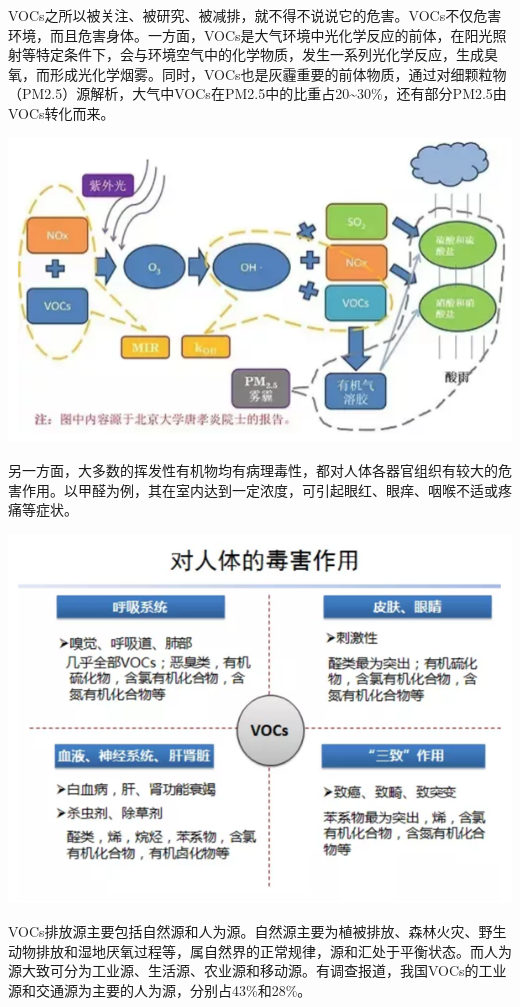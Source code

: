 \documentclass[
]{book}
\begin{document}
VOCs之所以被关注、被研究、被减排，就不得不说说它的危害。VOCs不仅危害环境，而且危害身体。一方面，VOCs是大气环境中光化学反应的前体，在阳光照射等特定条件下，会与环境空气中的化学物质，发生一系列光化学反应，生成臭氧，而形成光化学烟雾。同时，VOCs也是灰霾重要的前体物质，通过对细颗粒物（PM2.5）源解析，大气中VOCs在PM2.5中的比重占20\textasciitilde30\%，还有部分PM2.5由VOCs转化而来。

\includegraphics[width=8.33in]{images/voc2}

另一方面，大多数的挥发性有机物均有病理毒性，都对人体各器官组织有较大的危害作用。以甲醛为例，其在室内达到一定浓度，可引起眼红、眼痒、咽喉不适或疼痛等症状。

\includegraphics[width=8.33in]{images/voc3}

VOCs排放源主要包括自然源和人为源。自然源主要为植被排放、森林火灾、野生动物排放和湿地厌氧过程等，属自然界的正常规律，源和汇处于平衡状态。而人为源大致可分为工业源、生活源、农业源和移动源。有调查报道，我国VOCs的工业源和交通源为主要的人为源，分别占43\%和28\%。
\end{document}
